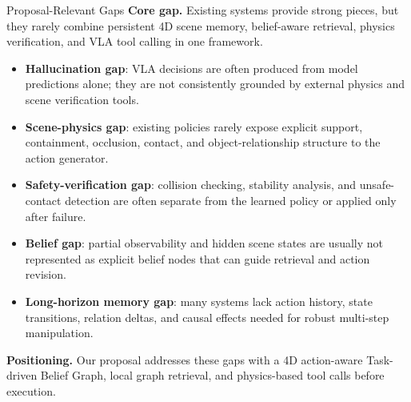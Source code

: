 \begin{frame}{Proposal-Relevant Gaps}
\small
\textbf{Core gap.} Existing systems provide strong pieces, but they rarely combine persistent 4D scene memory, belief-aware retrieval, physics verification, and VLA tool calling in one framework.

\vspace{0.6em}
\begin{itemize}
\item \textbf{Hallucination gap}: VLA decisions are often produced from model predictions alone; they are not consistently grounded by external physics and scene verification tools.
\item \textbf{Scene-physics gap}: existing policies rarely expose explicit support, containment, occlusion, contact, and object-relationship structure to the action generator.
\item \textbf{Safety-verification gap}: collision checking, stability analysis, and unsafe-contact detection are often separate from the learned policy or applied only after failure.
\item \textbf{Belief gap}: partial observability and hidden scene states are usually not represented as explicit belief nodes that can guide retrieval and action revision.
\item \textbf{Long-horizon memory gap}: many systems lack action history, state transitions, relation deltas, and causal effects needed for robust multi-step manipulation.
\end{itemize}

\vspace{0.4em}
\textbf{Positioning.} Our proposal addresses these gaps with a 4D action-aware Task-driven Belief Graph, local graph retrieval, and physics-based tool calls before execution.
\end{frame}

